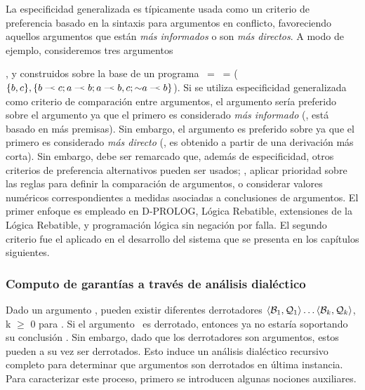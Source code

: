 La especificidad generalizada es típicamente usada como un criterio de preferencia basado en la sintaxis 
para argumentos en conflicto, favoreciendo aquellos argumentos que están \textit{más informados} o son 
\textit{más directos}. A modo de ejemplo, consideremos tres argumentos 

,  y 
construidos sobre la base de un programa \PP\ = \SD\ = ($\{b,c\},\{\drule{b}{c};\drule{a}{b};\drule{a}{b,c};\drule{\no a}{b}\}$).
Si se utiliza especificidad generalizada como criterio de comparación entre argumentos, el argumento 
 sería preferido sobre el argumento  ya que el primero es considerado \textit{más informado} (\ie, está basado en más premisas). Sin embargo, el argumento 
 es preferido sobre  ya que el primero es considerado \textit{más directo} (\ie, es obtenido a partir de una derivación más corta). Sin embargo, debe
ser remarcado que, además de especificidad, otros criterios de preferencia alternativos pueden ser usados; 
\eg, aplicar prioridad sobre las reglas para definir la comparación de argumentos, o considerar valores 
numéricos correspondientes a medidas asociadas a conclusiones de argumentos. El primer enfoque es empleado en
{\footnotesize D}-P{\footnotesize ROLOG}, Lógica Rebatible, extensiones de la Lógica Rebatible, y programación lógica sin negación por falla.
El segundo criterio fue el aplicado en el desarrollo del sistema que se presenta en los capítulos siguientes.

\subsubsection{Computo de garantías a través de análisis dialéctico}

Dado un argumento \AQ, pueden existir diferentes derrotadores $\mbox{$\langle \mbox{${\mathcal B_1}$},\mbox{${\mathcal Q_1}$} \rangle $}\ldots\mbox{$\langle \mbox{${\mathcal B_k}$},\mbox{${\mathcal Q_k}$} \rangle $}$, k $\ge$ 0 para
\AQ. Si el argumento \AQ\ es derrotado, entonces ya no estaría soportando su conclusión \ArgQ. 
Sin embargo, dado que los derrotadores son argumentos, estos pueden a su vez ser derrotados. Esto 
induce un análisis dialéctico recursivo completo para determinar que argumentos son derrotados en 
última instancia. Para caracterizar este proceso, primero se introducen algunas nociones auxiliares.

